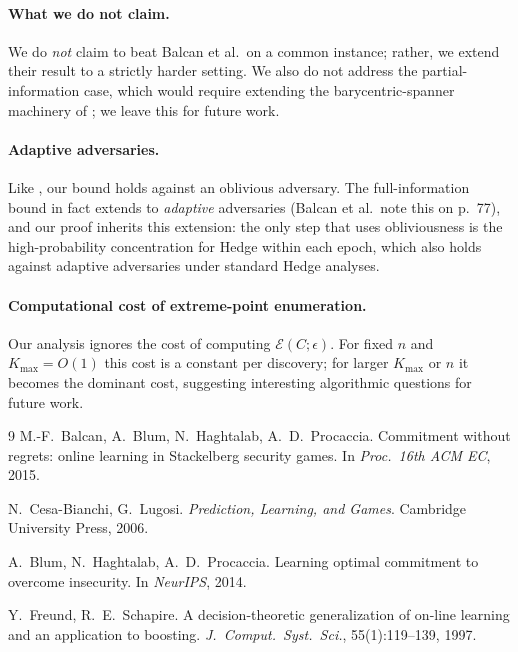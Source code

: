 \documentclass[11pt]{article}
\newcommand{\cE}{\mathcal{E}}
\newcommand{\Kmax}{K_{\max}}
\begin{document}
\paragraph{What we do not claim.} We do \emph{not} claim to beat Balcan et al.\ on a common instance; rather, we extend their result to a strictly harder setting. We also do not address the partial-information case, which would require extending the barycentric-spanner machinery of \cite[Section~6]{balcan2015}; we leave this for future work.

\paragraph{Adaptive adversaries.} Like \cite[Theorem~5.1]{balcan2015}, our bound holds against an oblivious adversary. The full-information bound in fact extends to \emph{adaptive} adversaries (Balcan et al.\ note this on p.~77), and our proof inherits this extension: the only step that uses obliviousness is the high-probability concentration for Hedge within each epoch, which also holds against adaptive adversaries under standard Hedge analyses.

\paragraph{Computational cost of extreme-point enumeration.} Our analysis ignores the cost of computing $\cE(C;\epsilon)$. For fixed $n$ and $\Kmax = O(1)$ this cost is a constant per discovery; for larger $\Kmax$ or $n$ it becomes the dominant cost, suggesting interesting algorithmic questions for future work.

\begin{thebibliography}{9}
M.-F.~Balcan, A.~Blum, N.~Haghtalab, A.~D.~Procaccia.
\newblock Commitment without regrets: online learning in Stackelberg security games.
\newblock In \emph{Proc.\ 16th ACM EC}, 2015.

N.~Cesa-Bianchi, G.~Lugosi.
\newblock \emph{Prediction, Learning, and Games}.
\newblock Cambridge University Press, 2006.

A.~Blum, N.~Haghtalab, A.~D.~Procaccia.
\newblock Learning optimal commitment to overcome insecurity.
\newblock In \emph{NeurIPS}, 2014.

Y.~Freund, R.~E.~Schapire.
\newblock A decision-theoretic generalization of on-line learning and an application to boosting.
\newblock \emph{J.\ Comput.\ Syst.\ Sci.}, 55(1):119--139, 1997.
\end{thebibliography}
\end{document}

